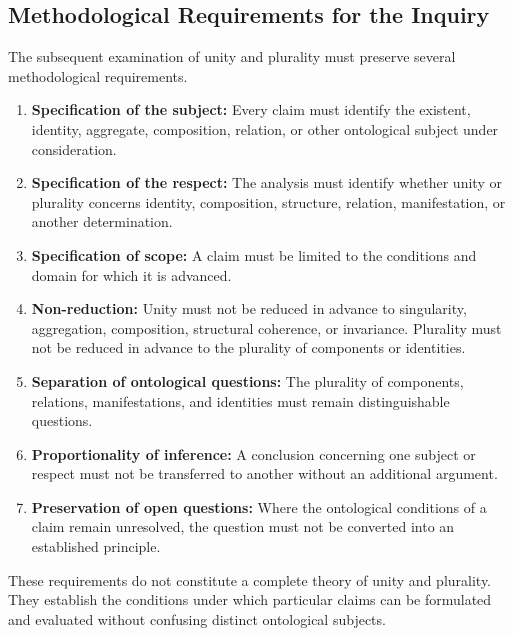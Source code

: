 \subsection{Methodological Requirements for the Inquiry}

The subsequent examination of unity and plurality
must preserve several methodological requirements.

\begin{enumerate}
    \item \textbf{Specification of the subject:}
    Every claim must identify the existent,
    identity, aggregate, composition, relation,
    or other ontological subject under consideration.

    \item \textbf{Specification of the respect:}
    The analysis must identify whether unity
    or plurality concerns identity, composition,
    structure, relation, manifestation, or
    another determination.

    \item \textbf{Specification of scope:}
    A claim must be limited to the conditions
    and domain for which it is advanced.

    \item \textbf{Non-reduction:}
    Unity must not be reduced in advance to
    singularity, aggregation, composition,
    structural coherence, or invariance.
    Plurality must not be reduced in advance
    to the plurality of components or identities.

    \item \textbf{Separation of ontological questions:}
    The plurality of components, relations,
    manifestations, and identities must remain
    distinguishable questions.

    \item \textbf{Proportionality of inference:}
    A conclusion concerning one subject or
    respect must not be transferred to another
    without an additional argument.

    \item \textbf{Preservation of open questions:}
    Where the ontological conditions of a claim
    remain unresolved, the question must not
    be converted into an established principle.
\end{enumerate}

These requirements do not constitute a complete
theory of unity and plurality. They establish
the conditions under which particular claims
can be formulated and evaluated without
confusing distinct ontological subjects.

